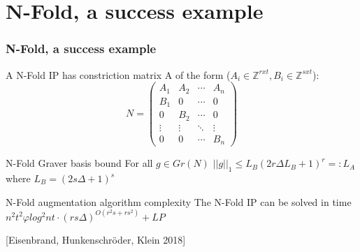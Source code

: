 \documentclass{beamer}
\begin{document}
    \section{N-Fold, a success example}
    \begin{frame}
        \frametitle{N-Fold, a success example}
        
        A N-Fold IP has constriction matrix A of the form ($A_i \in \mathbb{Z}^{rxt}, B_i \in \mathbb{Z}^{sxt}$):\\
        \begin{equation*}
        N = 
        \begin{pmatrix}
        A_1 & A_2 & \cdots & A_n \\
        B_1 & 0   & \cdots & 0 \\
        0   & B_2 & \cdots & 0 \\
        \vdots    & \vdots & \ddots & \vdots  \\
        0   & 0   & \cdots & B_n 
        \end{pmatrix}
        \end{equation*}
        
        
        \begin{block}{N-Fold Graver basis bound}
            For all $g \in Gr(N)$ $||g||_1 \leq L_B (2r\Delta L_B + 1)^r =: L_A$ where $L_B = (2s \Delta + 1)^s$
        \end{block}
        \begin{block}{N-Fold augmentation algorithm complexity}
            The N-Fold IP can be solved in time $n^2t^2\varphi log^2nt \cdot (rs\Delta)^{O(r^2s + rs^2)} + LP$
        \end{block}
        
        [Eisenbrand, Hunkenschröder, Klein 2018]
    \end{frame}
    
\end{document}

